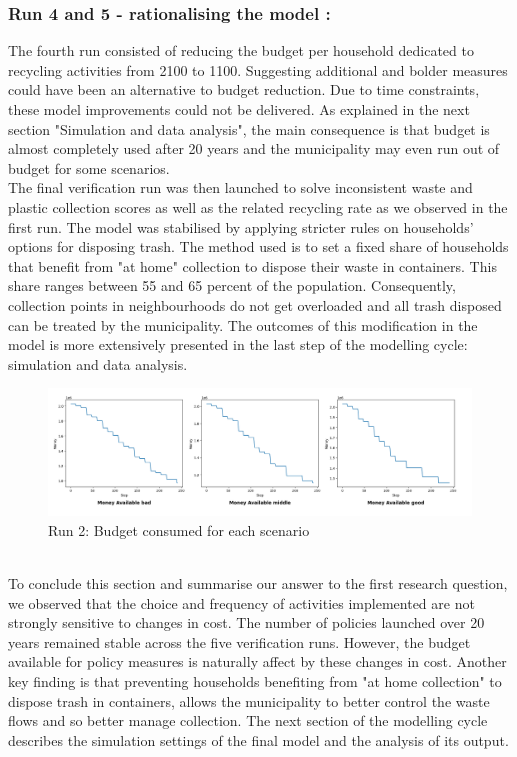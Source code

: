 \subsubsection{Run 4 and 5 - rationalising the model :}
The fourth run consisted of reducing the budget per household dedicated to recycling activities from 2100 to 1100. Suggesting additional and bolder measures could have been an alternative to budget reduction. Due to time constraints, these model improvements could not be delivered. As explained in the next section "Simulation and data analysis", the main consequence is that budget is almost completely used after 20 years and the municipality may even run out of budget for some scenarios. \\

\noindent The final verification run was then launched to solve inconsistent waste and plastic collection scores as well as the related recycling rate as we observed in the first run. The model was stabilised by applying stricter rules on households' options for disposing trash. The method used is to set a fixed share of households that benefit from "at home" collection to dispose their waste in containers. This share ranges between 55 and 65 percent of the population. Consequently, collection points in neighbourhoods do not get overloaded and all trash disposed can be treated by the municipality. The outcomes of this modification in the model is more extensively presented in the last step of the modelling cycle: simulation and data analysis.

\begin{figure}[H]
    \centering
        \captionsetup{width=\linewidth}
        \includegraphics[width=1.0\linewidth]{Images/Run 2 budget.png}
        \caption{Run 2: Budget consumed for each scenario}
    \label{fig:Run 2 budget}
\end{figure}\\

\noindent To conclude this section and summarise our answer to the first research question, we observed that the choice and frequency of activities implemented are not strongly sensitive to changes in cost. The number of policies launched over 20 years remained stable across the five verification runs. However, the budget available for policy measures is naturally affect by these changes in cost. Another key finding is that preventing households benefiting from "at home collection" to dispose trash in containers, allows the municipality to better control the waste flows and so better manage collection. The next section of the modelling cycle describes the simulation settings of the final model and the analysis of its output.  

